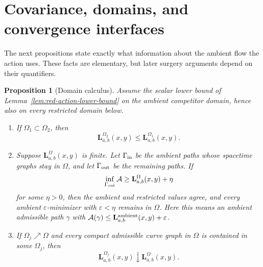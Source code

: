 \documentclass[10pt]{coll-l}
\newtheorem{proposition}[theorem]{Proposition}
\theoremstyle{definition}
\theoremstyle{remark}
\numberwithin{section}{chapter}
\numberwithin{equation}{chapter}
\begin{document}
\section{Covariance, domains, and convergence interfaces}
\label{sec:red-covariance}

The next propositions state exactly what information about the ambient flow
the action uses.  These facts are elementary, but later surgery arguments
depend on their quantifiers.

\begin{proposition}[Domain calculus]
\label{prop:red-domain-calculus}
Assume the scalar lower bound of Lemma~\ref{lem:red-action-lower-bound} on
the ambient competitor domain, hence also on every restricted domain below.
\begin{enumerate}
\item If $\Omega_1\subset\Omega_2$, then
\begin{equation}
       \mathbf L^{\Omega_2}_{a,b}(x,y)
       \leq\mathbf L^{\Omega_1}_{a,b}(x,y).             \label{eq:red-domain-monotonicity}
\end{equation}
\item Suppose $\mathbf L^\Omega_{a,b}(x,y)$ is finite.  Let
      $\Gamma_{\rm in}$ be the ambient paths whose spacetime graphs stay
      in $\Omega$, and let $\Gamma_{\rm out}$ be the remaining paths.  If
\begin{equation}
 \inf_{\Gamma_{\rm out}}\mathcal A
       \geq \mathbf L^\Omega_{a,b}(x,y)+\eta             \label{eq:red-domain-gap}
\end{equation}
for some $\eta>0$, then the ambient and restricted values agree, and every
      ambient $\varepsilon$-minimizer with $\varepsilon<\eta$ remains in
      $\Omega$.  Here this means an ambient admissible path $\gamma$ with
      $\mathcal A(\gamma)\leq\mathbf L^{\rm ambient}_{a,b}(x,y)+\varepsilon$.
\item If $\Omega_j\nearrow\Omega$ and every compact admissible curve graph
      in $\Omega$ is contained in some $\Omega_j$, then
\begin{equation}
             \mathbf L^{\Omega_j}_{a,b}(x,y)
             \downarrow\mathbf L^\Omega_{a,b}(x,y).     \label{eq:red-domain-exhaustion}
\end{equation}
\end{enumerate}
\end{proposition}
\end{document}
